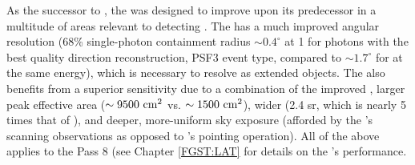 As the successor to \egret{}, the \lat{} was designed to improve upon its predecessor in a multitude of areas relevant to detecting \snrs{} \citep{atwood09,lat_perf}. The \lat{} has a much improved angular resolution (68\% single-photon containment radius $\sim 0.4^{\circ}$ at 1\gev{} for photons with the best quality direction reconstruction, PSF3 event type, compared to $\sim 1.7^{\circ}$ for \egret{} at the same energy), which is necessary to resolve \snrs{} as extended objects. The \lat{} also benefits from a superior sensitivity due to a combination of the improved \psf, larger peak effective area ($ {\rm \sim 9500~cm^2}$ vs. ${\rm \sim 1500~cm^2}$), wider \fov{} (2.4 sr, which is nearly 5 times that of \egret{}), and deeper, more-uniform sky exposure (afforded by the \lat's scanning observations as opposed to \egret's pointing operation). All of the above applies to the Pass 8 \irf{} (see Chapter \ref{FGST:LAT} for details on the \lat{}'s performance.

